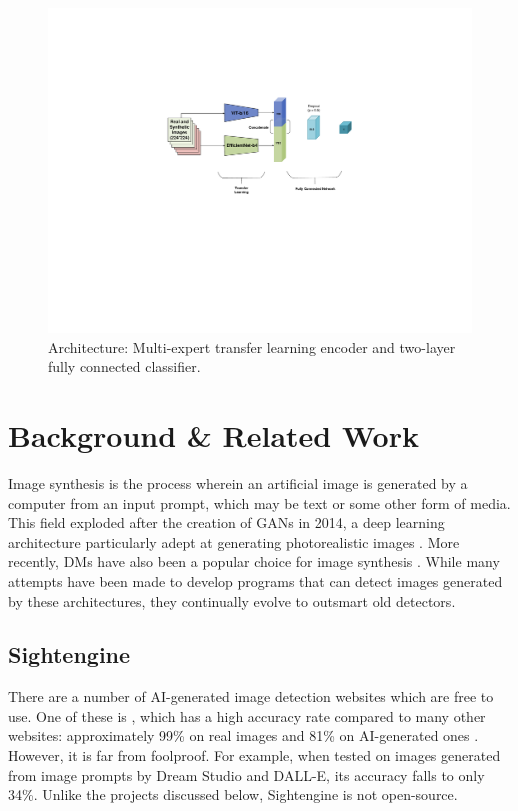 \documentclass{article} %
\begin{document}
\begin{figure}[h]
    \begin{center}
        \includegraphics[scale=0.5]{figs/EffiVit.pdf}
    \end{center}
    \caption{Architecture: Multi-expert transfer learning encoder and two-layer fully connected classifier.}
    \label{fig:EffVit Architecture}
\end{figure}

\section{Background \& Related Work}
\label{background}

Image synthesis is the process wherein an artificial image is generated by a computer from an input prompt, which may be text or some other form of media. This field exploded after the creation of GANs in 2014, a deep learning architecture particularly adept at generating photorealistic images \citep{GANfather}. More recently, DMs have also been a popular choice for image synthesis \citep{latent-diffusion}. While many attempts have been made to develop programs that can detect images generated by these architectures, they continually evolve to outsmart old detectors.

\subsection{Sightengine}

There are a number of AI-generated image detection websites which are free to use. One of these is \citet{sightengine}, which has a high accuracy rate compared to many other websites: approximately 99\% on real images and 81\% on AI-generated ones \citep{li2024adversarialaiartunderstandinggeneration}. However, it is far from foolproof. For example, when tested on images generated from image prompts by Dream Studio and DALL-E, its accuracy falls to only 34\%. Unlike the projects discussed below, Sightengine is not open-source.
\end{document}
